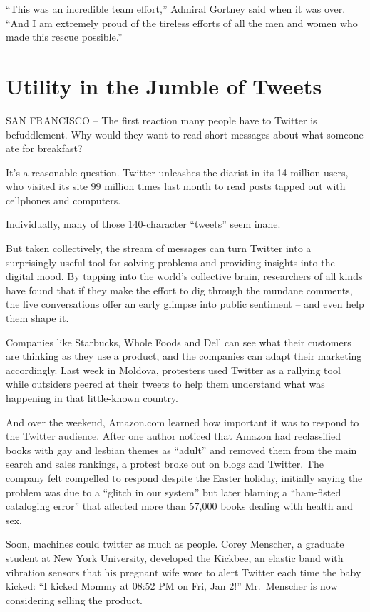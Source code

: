 \documentclass[12pt,a4paper,onecolumn]{article}
\begin{document}
``This was an incredible team effort,'' Admiral Gortney said when it was over. ``And I am extremely
proud of the tireless efforts of all the men and women who made this rescue possible.''

\section{Utility in the Jumble of Tweets}

SAN FRANCISCO -- The first reaction many people have to Twitter is befuddlement. Why would they want
to read short messages about what someone ate for breakfast?

It's a reasonable question. Twitter unleashes the diarist in its 14 million users, who visited its
site 99 million times last month to read posts tapped out with cellphones and computers.

Individually, many of those 140-character ``tweets'' seem inane.

But taken collectively, the stream of messages can turn Twitter into a surprisingly useful tool for
solving problems and providing insights into the digital mood. By tapping into the world's
collective brain, researchers of all kinds have found that if they make the effort to dig through
the mundane comments, the live conversations offer an early glimpse into public sentiment -- and
even help them shape it.

Companies like Starbucks, Whole Foods and Dell can see what their customers are thinking as they use
a product, and the companies can adapt their marketing accordingly. Last week in Moldova, protesters
used Twitter as a rallying tool while outsiders peered at their tweets to help them understand what
was happening in that little-known country.

And over the weekend, Amazon.com learned how important it was to respond to the Twitter audience.
After one author noticed that Amazon had reclassified books with gay and lesbian themes as ``adult''
and removed them from the main search and sales rankings, a protest broke out on blogs and Twitter.
The company felt compelled to respond despite the Easter holiday, initially saying the problem was
due to a ``glitch in our system'' but later blaming a ``ham-fisted cataloging error'' that affected
more than 57,000 books dealing with health and sex.

Soon, machines could twitter as much as people. Corey Menscher, a graduate student at New York
University, developed the Kickbee, an elastic band with vibration sensors that his pregnant wife
wore to alert Twitter each time the baby kicked: ``I kicked Mommy at 08:52 PM on Fri, Jan 2!''
Mr.~Menscher is now considering selling the product.
\end{document}
